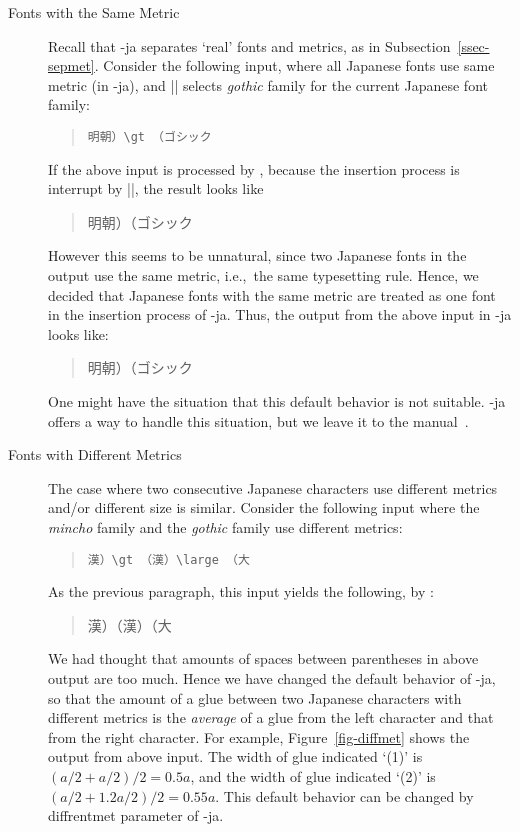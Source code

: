 \documentclass{ajt}
\begin{document}
\begin{description}
\item[Fonts with the Same Metric]
Recall that \LuaTeX-ja separates `real' fonts and metrics, as in Subsection~\ref{ssec-sepmet}. 
Consider the following input, where all Japanese fonts use same metric
	   (in \LuaTeX-ja), and |\gt| selects \emph{gothic} family for
	   the current Japanese font family:
\begin{quote}
\begin{verbatim}
明朝）\gt （ゴシック
\end{verbatim}
\end{quote}
If the above input is processed by \pTeX, because the insertion process is
	   interrupt by |\gt|, the result looks like
\begin{quote}
\mc 明朝）\hbox{}\gt （ゴシック
\end{quote}
However this seems to be unnatural, since two Japanese fonts in the
	   output use the same metric, i.e.,~the same
	   typesetting rule.  Hence, we decided that Japanese fonts with
	   the same metric are treated as one font in the insertion
	   process of \LuaTeX-ja. Thus, the output from the above input
	   in \LuaTeX-ja looks like:
\begin{quote}
\mc 明朝）\gt （ゴシック
\end{quote}
One might have the situation that this default behavior is not
	   suitable. \LuaTeX-ja offers a way to handle this situation, but
	   we leave it to the manual~\cite{man}.

\item[Fonts with Different Metrics] 
The case where two consecutive Japanese characters use different metrics and/or
	   different size is similar. Consider the following input where
	   the \emph{mincho} family and the \emph{gothic} family use
	   different metrics:
\begin{quote}
\begin{verbatim}
漢）\gt （漢）\large （大
\end{verbatim}
\end{quote}
As the previous paragraph, this input yields the following, by \pTeX:
\begin{quote}
\mc 漢）\hbox{}\gt （漢）\hbox{}\large （大
\end{quote}
We had thought that amounts of spaces between parentheses in above output
	   are too much. Hence we have changed the default behavior of
	   \LuaTeX-ja, so that the amount of a glue between two Japanese
	   characters with different metrics is the \emph{average} of a glue
	   from the left character and that from the right
	   character. For example, Figure~\ref{fig-diffmet} shows the
	   output from above input. The width of glue indicated `(1)' is
	   $(a/2 + a/2)/2 = 0.5a$, and the width of glue indicated `(2)'
	   is $(a/2 + 1.2a/2)/2 = 0.55a$. This default behavior can be
	   changed by \textsf{diffrentmet} parameter of \LuaTeX-ja.


\end{description}
\end{document}
